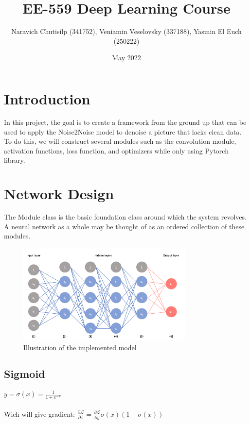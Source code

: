 \documentclass{article}
\title{\vspace{-0.5cm}
    \fontsize{14}{18} \selectfont {\textbf{Project 2 - Noise2Noise model from Scratch}}\\
    \fontsize{12}{18} {\selectfont EE-559 Deep Learning Course}
    }
\author{Naravich Chutisilp (341752), Veniamin Veselovsky (337188), Yasmin El Euch (250222)}
\date{May 2022}
\begin{document}
\maketitle

\begin{multicols}{2}
\section{Introduction}
In this project, the goal is to create a framework from the ground up that can be used to apply the Noise2Noise model to denoise a picture that lacks clean data. To do this, we will construct several modules such as the convolution module, activation functions, loss function, and optimizers while only using Pytorch library.

\section{Network Design}



The Module class is the basic foundation class around which the system revolves. A neural network as a whole may be thought of as an ordered collection of these modules. 
\begin{figure}[H] 
\centering \includegraphics[width = 8.8cm]{pip.png}
\caption{Illustration of the implemented model}
\label{fig:model}
\end{figure}


\subsection{Sigmoid}
\begin{enumerate}
$
y = \sigma(x) = \frac{1}{1 + e^{-x}}
$
\\
\\
Wich will give gradient:
$
\frac{\partial {\mathcal{L}}}{\partial x} = 
    \frac{\partial {\mathcal{L}}}{\partial y} \sigma(x) (1 - \sigma(x))
$
\\
\end{enumerate}


\end{multicols}
\end{document}
